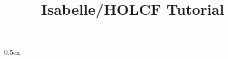 \documentclass[11pt,a4paper]{article}
\begin{document}
\title{Isabelle/HOLCF Tutorial}
\maketitle

\tableofcontents

\parindent 0pt\parskip 0.5ex

\end{document}
